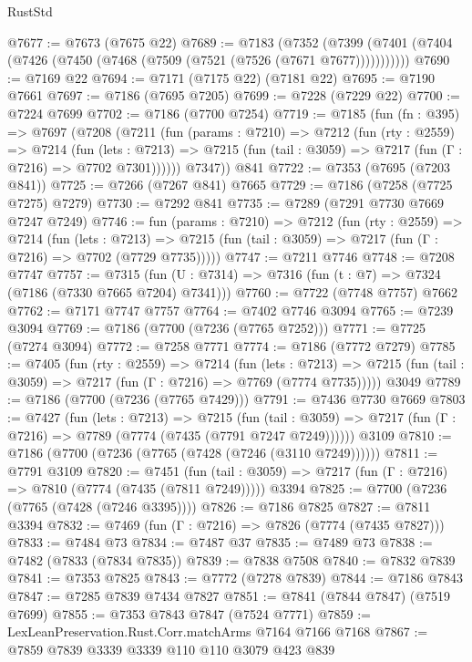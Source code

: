 \begin{lexlean}{RustStd}
\begin{coremodule}
{\begin{coremodule}
{{{{{{{{{{{{{{{{{{{{{{{{{{{{{{{{@7677 := @7673 (@7675 @22)
@7689 := @7183
    (@7352 (@7399 (@7401 (@7404 (@7426 (@7450 (@7468 (@7509 (@7521 (@7526 (@7671 @7677)))))))))))
@7690 := @7169 @22
@7694 := @7171 (@7175 @22) (@7181 @22)
@7695 := @7190 @7661
@7697 := @7186 (@7695 @7205)
@7699 := @7228 (@7229 @22)
@7700 := @7224 @7699
@7702 := @7186 (@7700 @7254)
@7719 := @7185
    (fun (fn : @395) =>
    @7697
      (@7208
        (@7211
          (fun (params : @7210) =>
          @7212
            (fun (rty : @2559) =>
            @7214
              (fun (lets : @7213) =>
              @7215 (fun (tail : @3059) => @7217 (fun (Γ : @7216) => @7702 @7301))))))
        @7347))
    @841
@7722 := @7353 (@7695 (@7203 @841))
@7725 := @7266 (@7267 @841) @7665
@7729 := @7186 (@7258 (@7725 @7275) @7279)
@7730 := @7292 @841
@7735 := @7289 (@7291 @7730 @7669 @7247 @7249)
@7746 := fun (params : @7210) =>
  @7212
    (fun (rty : @2559) =>
    @7214
      (fun (lets : @7213) =>
      @7215 (fun (tail : @3059) => @7217 (fun (Γ : @7216) => @7702 (@7729 @7735)))))
@7747 := @7211 @7746
@7748 := @7208 @7747
@7757 := @7315 (fun (U : @7314) => @7316 (fun (t : @7) => @7324 (@7186 (@7330 @7665 @7204) @7341)))
@7760 := @7722 (@7748 @7757) @7662
@7762 := @7171 @7747 @7757
@7764 := @7402 @7746 @3094
@7765 := @7239 @3094
@7769 := @7186 (@7700 (@7236 (@7765 @7252)))
@7771 := @7725 (@7274 @3094)
@7772 := @7258 @7771
@7774 := @7186 (@7772 @7279)
@7785 := @7405
    (fun (rty : @2559) =>
    @7214
      (fun (lets : @7213) =>
      @7215 (fun (tail : @3059) => @7217 (fun (Γ : @7216) => @7769 (@7774 @7735)))))
    @3049
@7789 := @7186 (@7700 (@7236 (@7765 @7429)))
@7791 := @7436 @7730 @7669
@7803 := @7427
    (fun (lets : @7213) =>
    @7215
      (fun (tail : @3059) => @7217 (fun (Γ : @7216) => @7789 (@7774 (@7435 (@7791 @7247 @7249))))))
    @3109
@7810 := @7186 (@7700 (@7236 (@7765 (@7428 (@7246 (@3110 @7249))))))
@7811 := @7791 @3109
@7820 := @7451
    (fun (tail : @3059) => @7217 (fun (Γ : @7216) => @7810 (@7774 (@7435 (@7811 @7249)))))
    @3394
@7825 := @7700 (@7236 (@7765 (@7428 (@7246 @3395))))
@7826 := @7186 @7825
@7827 := @7811 @3394
@7832 := @7469 (fun (Γ : @7216) => @7826 (@7774 (@7435 @7827)))
@7833 := @7484 @73
@7834 := @7487 @37
@7835 := @7489 @73
@7838 := @7482 (@7833 (@7834 @7835))
@7839 := @7838 @7508
@7840 := @7832 @7839
@7841 := @7353 @7825
@7843 := @7772 (@7278 @7839)
@7844 := @7186 @7843
@7847 := @7285 @7839 @7434 @7827
@7851 := @7841 (@7844 @7847) (@7519 @7699)
@7855 := @7353 @7843 @7847 (@7524 @7771)
@7859 := LexLeanPreservation.Rust.Corr.matchArms @7164 @7166 @7168
@7867 := @7859 @7839 @3339 @3339 @110 @110 @3079 @423 @839
}}}}}}}}}}}}}}}}}}}}}}}}}}}}}}}}
\end{coremodule}}
\end{coremodule}
\end{lexlean}
